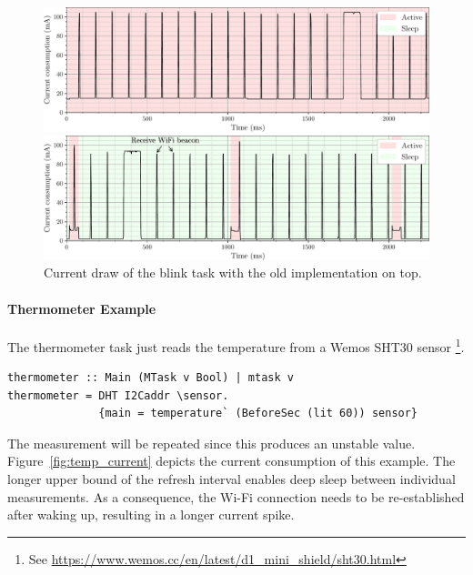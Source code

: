 \documentclass[runningheads]{llncs}
\begin{document}
\begin{figure}[ht]
	\centering
	\begin{minipage}{0.9\textwidth}
		\includegraphics[width=\textwidth]{blink-old-plot.pdf}
	\end{minipage}
	\begin{minipage}{0.9\textwidth}
		\includegraphics[width=\textwidth]{blink-plot.pdf}
	\end{minipage}
	\caption{Current draw of the blink task with the old implementation on top.}%
	\label{fig:blink_current}
\end{figure}

\paragraph{Thermometer Example}

The thermometer task just reads the temperature from a Wemos SHT30 sensor%
\footnote{See \url{https://www.wemos.cc/en/latest/d1_mini_shield/sht30.html}}.

\begin{lstlisting}[language=Clean,caption={A basic thermometer task.},label={lst:thermometer}]
thermometer :: Main (MTask v Bool) | mtask v
thermometer = DHT I2Caddr \sensor.
              {main = temperature` (BeforeSec (lit 60)) sensor}
\end{lstlisting}

The measurement will be repeated since this produces an unstable value.
Figure~\ref{fig:temp_current} depicts the current consumption of this example.
The longer upper bound of the refresh interval enables deep sleep between individual measurements.
As a consequence, the Wi-Fi connection needs to be re-established after waking up, resulting in a longer current spike.
\end{document}

